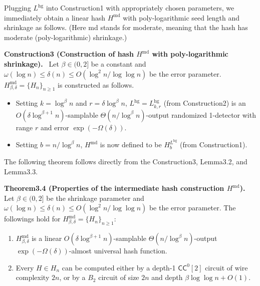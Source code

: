 \documentclass[10pt,a4paper]{article}
\newenvironment{authorclaim}[1]{\par\medskip\noindent\textbf{#1.}\ }{\par\medskip}
\begin{document}
Plugging $L^{\mathrm{hg}}$ into Construction1 with appropriately chosen parameters, we immediately obtain a linear hash $H^{\mathrm{md}}$ with poly-logarithmic seed length and shrinkage as follows. (Here md stands for moderate, meaning that the hash has moderate (poly-logarithmic) shrinkage.)
\begin{authorclaim}{Construction3 (Construction of hash $H^{\mathrm{md}}$ with poly-logarithmic shrinkage)}
Let $\beta\in(0,2]$ be a constant and $\omega(\log n)\le\delta(n)\le O(\log^2n/\log\log n)$ be the error parameter. $H^{\mathrm{md}}_{\beta,\delta}=\{H_n\}_{n\ge1}$ is constructed as follows.
\begin{itemize}
\item Setting $k=\log^\beta n$ and $r=\delta\log^\beta n$, $L^{\mathrm{hg}}=L^{\mathrm{hg}}_{k,r}$ (from Construction2) is an $O(\delta\log^{\beta+1}n)$-samplable $\Theta(n/\log^\beta n)$-output randomized 1-detector with range $r$ and error $\exp(-\Omega(\delta))$.
\item Setting $b=n/\log^\beta n$, $H^{\mathrm{md}}$ is now defined to be $H_b^{L^{\mathrm{hg}}}$ (from Construction1).
\end{itemize}
\end{authorclaim}
The following theorem follows directly from the Construction3, Lemma3.2, and Lemma3.3.
\begin{authorclaim}{Theorem3.4 (Properties of the intermediate hash construction $H^{\mathrm{md}}$)}
Let $\beta\in(0,2]$ be the shrinkage parameter and $\omega(\log n)\le\delta(n)\le O(\log^2n/\log\log n)$ be the error parameter. The followings hold for $H^{\mathrm{md}}_{\beta,\delta}=\{H_n\}_{n\ge1}$:
\begin{enumerate}
\item $H^{\mathrm{md}}_{\beta,\delta}$ is a linear $O(\delta\log^{\beta+1}n)$-samplable $\Theta(n/\log^\beta n)$-output $\exp(-\Omega(\delta))$-almost universal hash function.
\item Every $H\in H_n$ can be computed either by a depth-1 $\mathsf{CC}^0[2]$ circuit of wire complexity $2n$, or by a $B_2$ circuit of size $2n$ and depth $\beta\log\log n+O(1)$.
\end{enumerate}
\end{authorclaim}
\end{document}
